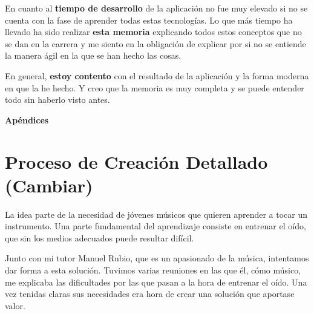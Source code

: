 \documentclass[12pt,twoside,titlepage]{report}
\newcommand\blankpage{%
    \newpage
    \null
    \thispagestyle{empty}%
    \newpage}
\begin{document}
{En cuanto al \textbf{tiempo de desarrollo} de la aplicación no fue muy elevado si no se cuenta con la fase de aprender todas estas tecnologías. Lo que más tiempo ha llevado ha sido realizar \textbf{esta memoria} explicando todos estos conceptos que no se dan en la carrera y me siento en la obligación de explicar por si no se entiende la manera ágil en la que se han hecho las cosas.

En general, \textbf{estoy contento} con el resultado de la aplicación y la forma moderna en que la he hecho. Y creo que la memoria es muy completa y se puede entender todo sin haberlo visto antes.

\blankpage




{}
\footnotesize{
%


}
\raggedbottom
\afterpage{\blankpage}
\newpage



\appendix
{}
{}
\mbox{}
\vfill
\begin{center}
\begin{Huge}
\textbf{Apéndices}
\end{Huge}
\end{center}
\vfill
\mbox{}
\thispagestyle{empty}
\newpage
\mbox{}
\thispagestyle{empty}
\newpage


\chapter{Proceso de Creación Detallado (Cambiar)}

La idea parte de la necesidad de jóvenes músicos que quieren aprender a tocar un instrumento. Una parte fundamental del aprendizaje consiste en entrenar el oído, que sin los medios adecuados puede resultar difícil.

Junto con mi tutor Manuel Rubio, que es un apasionado de la música, intentamos dar forma a esta solución. Tuvimos varias reuniones en las que él, cómo músico, me explicaba las dificultades por las que pasan a la hora de entrenar el oído. Una vez tenidas claras sus necesidades era hora de crear una solución que aportase valor.

}
\end{document}
